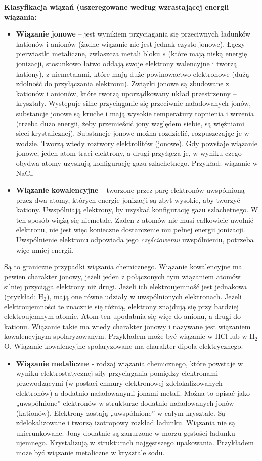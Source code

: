 \documentclass{article}
\begin{document}
\textbf{Klasyfikacja wiązań (uszeregowane według wzrastającej energii wiązania:}
\begin{itemize}
    \item \textbf{Wiązanie jonowe} -- jest wynikiem przyciągania się przeciwnych ładunków kationów i anionów (żadne wiązanie nie jest jednak czysto jonowe). Łączy pierwiastki metaliczne, zwłaszcza metali bloku $s$ (które mają niską energię jonizacji, stosunkowo łatwo oddają swoje elektrony walencyjne i tworzą kationy), z niemetalami, które mają duże powinowactwo elektronowe (dużą zdolność do przyłączania elektronu). Związki jonowe są zbudowane z kationów i anionów, które tworzą uporządkowany układ przestrzenny -- kryształy. Występuje silne przyciąganie się przeciwnie naładowanych jonów, substancje jonowe są kruche i mają wysokie temperatury topnienia i wrzenia (trzeba dużo energii, żeby przemieścić jony względem siebie, są więźniami sieci krystalicznej). Substancje jonowe można rozdzielić, rozpuszczając je w wodzie. Tworzą wtedy roztwory elektrolitów (jonowe). Gdy powstaje wiązanie jonowe, jeden atom traci elektrony, a drugi przyłącza je, w wyniku czego obydwa atomy uzyskują konfigurację gazu szlachetnego. Przykład: wiązanie w NaCl.
    \item \textbf{Wiązanie kowalencyjne} -- tworzone przez parę elektronów uwspólnioną przez dwa atomy, których energie jonizacji są zbyt wysokie, aby tworzyć kationy. Uwspólniają elektrony, by uzyskać konfigurację gazu szlachetnego. W ten sposób wiążą się niemetale. Żaden z atomów nie musi całkowicie uwolnić elektronu, nie jest więc konieczne dostarczenie mu pełnej energii jonizacji. Uwspólnienie elektronu odpowiada jego \textit{częściowemu} uwspólnieniu, potrzeba więc mniej energii.
\end{itemize}
Są to graniczne przypadki wiązania chemicznego. Wiązanie kowalencyjne ma pewien charakter jonowy, jeżeli jeden z połączonych tym wiązaniem atomów silniej przyciąga elektrony niż drugi. Jeżeli ich elektroujemność jest jednakowa (pryzkład: H$_2$), mają one równe udziały w uwspólnionych elektronach. Jeżeli elektroujemności te znacznie się różnią, elektrony znajdują się przy bardziej elektroujemnym atomie. Atom ten upodabnia się więc do anionu, a drugi do kationu. Wiązanie takie ma wtedy charakter jonowy i nazywane jest wiązaniem kowalencyjnym spolaryzowanym. Przykładem może być wiązanie w HCl lub w H$_2$O. Wiązanie kowalencyjne spolaryzowane ma charakter dipola elektrycznego.
\begin{itemize}
\item \textbf{Wiązanie metaliczne} - rodzaj wiązania chemicznego, które powstaje w wyniku elektrostatycznej siły przyciągania pomiędzy elektronami przewodzącymi (w postaci chmury elektronowej zdelokalizowanych elektronów) a dodatnio naładowanymi jonami metali. Można to opisać jako „uwspólnione” elektronów w strukturze dodatnio naładowanych jonów (kationów). Elektrony zostają „uwspólnione” w całym krysztale. Są zdelokalizowane i tworzą izotropowy rozkład ładunku. Wiązania nie są ukierunkowane. Jony dodatnie są zanurzone w morzu gęstości ładunku ujemnego. Krystalizują w strukturach najgęstszego upakowania. Przykładem może być wiązanie metaliczne w krysztale sodu.
\end{itemize}
\end{document}
